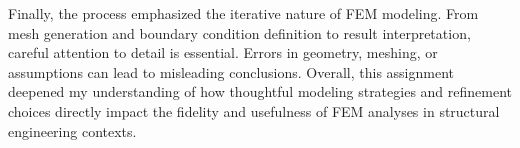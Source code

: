 \documentclass[12pt]{article}
\begin{document}
Finally, the process emphasized the iterative nature of FEM modeling. From mesh generation and boundary condition definition to result interpretation, careful attention to detail is essential. Errors in geometry, meshing, or assumptions can lead to misleading conclusions. Overall, this assignment deepened my understanding of how thoughtful modeling strategies and refinement choices directly impact the fidelity and usefulness of FEM analyses in structural engineering contexts.
\end{document}
